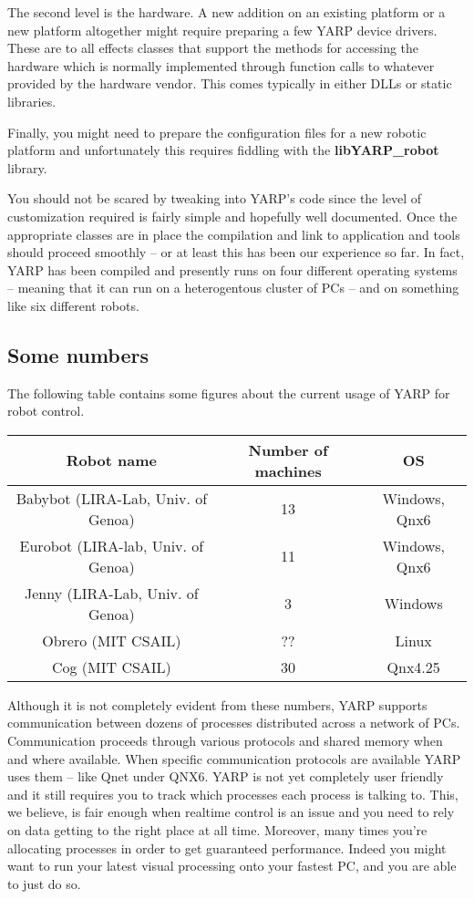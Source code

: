 The second level is the hardware. A new addition on an existing platform or a new platform altogether might require preparing a few YARP device drivers. These are to all effects classes that support the methods for accessing the hardware which is normally implemented through function calls to whatever provided by the hardware vendor. This comes typically in either DLLs or static libraries.

Finally, you might need to prepare the configuration files for a new robotic platform and unfortunately this requires fiddling with the {\bf libYARP\_robot} library.

You should not be scared by tweaking into YARP's code since the level of customization required is fairly simple and hopefully well documented. Once the appropriate classes are in place the compilation and link to application and tools should proceed smoothly -- or at least this has been our experience so far. In fact, YARP has been compiled and presently runs on four different operating systems -- meaning that it can run on a heterogentous cluster of PCs -- and on something like six different robots.

\subsection{Some numbers}
The following table contains some figures about the current usage of YARP for robot control.
\begin{table}[h]
	\centering
		\begin{tabular}{|c|c|c|}
		\hline
			Robot name & Number of machines & OS \\
			\hline \hline
			Babybot (LIRA-Lab, Univ. of Genoa) & 13 & Windows, Qnx6 \\
			\hline
			Eurobot (LIRA-lab, Univ. of Genoa) & 11 & Windows, Qnx6 \\
			\hline
			Jenny (LIRA-Lab, Univ. of Genoa) & 3 & Windows \\
			\hline
			Obrero (MIT CSAIL) & ?? & Linux \\
			\hline
			Cog (MIT CSAIL) & 30 & Qnx4.25 \\
			\hline
		\end{tabular}
\end{table}

Although it is not completely evident from these numbers, YARP supports communication between dozens of processes distributed across a network of PCs. Communication proceeds through various protocols and shared memory when and where available. When specific communication protocols are available YARP uses them -- like Qnet under QNX6. YARP is not yet completely user friendly and it still requires you to track which processes each process is talking to. This, we believe, is fair enough when realtime control is an issue and you need to rely on data getting to the right place at all time. Moreover, many times you're allocating processes in order to get guaranteed performance. Indeed you might want to run your latest visual processing onto your fastest PC, and you are able to just do so.

